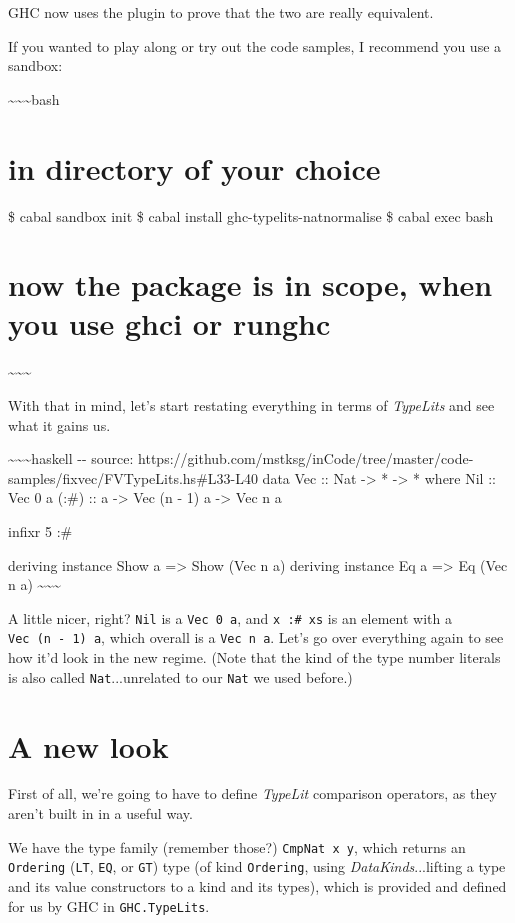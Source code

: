 \documentclass[]{article}
\begin{document}
GHC now uses the plugin to prove that the two are really equivalent.

If you wanted to play along or try out the code samples, I recommend you use a
sandbox:

\textasciitilde{}\textasciitilde{}\textasciitilde{}bash

\section{in directory of your choice}

\$ cabal sandbox init \$ cabal install ghc-typelits-natnormalise \$ cabal exec
bash

\section{now the package is in scope, when you use ghci or runghc}

\textasciitilde{}\textasciitilde{}\textasciitilde{}

With that in mind, let's start restating everything in terms of \emph{TypeLits}
and see what it gains us.

\textasciitilde{}\textasciitilde{}\textasciitilde{}haskell -\/- source:
https://github.com/mstksg/inCode/tree/master/code-samples/fixvec/FVTypeLits.hs\#L33-L40
data Vec :: Nat -\textgreater{} * -\textgreater{} * where Nil :: Vec 0 a (:\#)
:: a -\textgreater{} Vec (n - 1) a -\textgreater{} Vec n a

infixr 5 :\#

deriving instance Show a =\textgreater{} Show (Vec n a) deriving instance Eq a
=\textgreater{} Eq (Vec n a) \textasciitilde{}\textasciitilde{}\textasciitilde{}

A little nicer, right? \texttt{Nil} is a \texttt{Vec\ 0\ a}, and
\texttt{x\ :\#\ xs} is an element with a \texttt{Vec\ (n\ -\ 1)\ a}, which
overall is a \texttt{Vec\ n\ a}. Let's go over everything again to see how it'd
look in the new regime. (Note that the kind of the type number literals is also
called \texttt{Nat}...unrelated to our \texttt{Nat} we used before.)

\section{A new look}

First of all, we're going to have to define \emph{TypeLit} comparison operators,
as they aren't built in in a useful way.

We have the type family (remember those?) \texttt{CmpNat\ x\ y}, which returns
an \texttt{Ordering} (\texttt{LT}, \texttt{EQ}, or \texttt{GT}) type (of kind
\texttt{Ordering}, using \emph{DataKinds}...lifting a type and its value
constructors to a kind and its types), which is provided and defined for us by
GHC in \texttt{GHC.TypeLits}.
\end{document}
